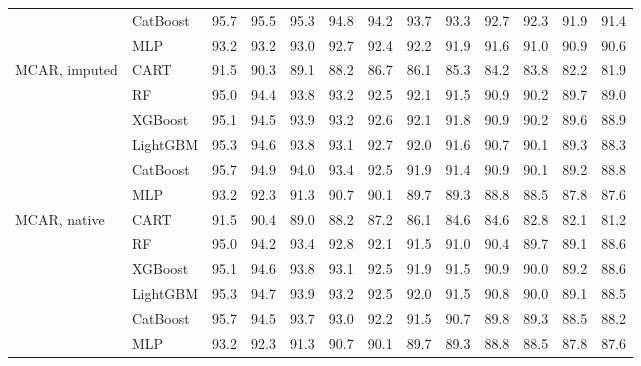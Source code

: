 \begin{table}[p]
\begin{tabular}{@{}llrrrrrrrrrrr@{}}
 & CatBoost & 95.7 & 95.5 & 95.3 & 94.8 & 94.2 & 93.7 & 93.3 & 92.7 & 92.3 & 91.9 & 91.4 \\
 & MLP & 93.2 & 93.2 & 93.0 & 92.7 & 92.4 & 92.2 & 91.9 & 91.6 & 91.0 & 90.9 & 90.6 \\
\midrule
MCAR, imputed & CART & 91.5 & 90.3 & 89.1 & 88.2 & 86.7 & 86.1 & 85.3 & 84.2 & 83.8 & 82.2 & 81.9 \\
 & RF & 95.0 & 94.4 & 93.8 & 93.2 & 92.5 & 92.1 & 91.5 & 90.9 & 90.2 & 89.7 & 89.0 \\
 & XGBoost & 95.1 & 94.5 & 93.9 & 93.2 & 92.6 & 92.1 & 91.8 & 90.9 & 90.2 & 89.6 & 88.9 \\
 & LightGBM & 95.3 & 94.6 & 93.8 & 93.1 & 92.7 & 92.0 & 91.6 & 90.7 & 90.1 & 89.3 & 88.3 \\
 & CatBoost & 95.7 & 94.9 & 94.0 & 93.4 & 92.5 & 91.9 & 91.4 & 90.9 & 90.1 & 89.2 & 88.8 \\
 & MLP & 93.2 & 92.3 & 91.3 & 90.7 & 90.1 & 89.7 & 89.3 & 88.8 & 88.5 & 87.8 & 87.6 \\
\midrule
MCAR, native & CART & 91.5 & 90.4 & 89.0 & 88.2 & 87.2 & 86.1 & 84.6 & 84.6 & 82.8 & 82.1 & 81.2 \\
 & RF & 95.0 & 94.2 & 93.4 & 92.8 & 92.1 & 91.5 & 91.0 & 90.4 & 89.7 & 89.1 & 88.6 \\
 & XGBoost & 95.1 & 94.6 & 93.8 & 93.1 & 92.5 & 91.9 & 91.5 & 90.9 & 90.0 & 89.2 & 88.6 \\
 & LightGBM & 95.3 & 94.7 & 93.9 & 93.2 & 92.5 & 92.0 & 91.5 & 90.8 & 90.0 & 89.1 & 88.5 \\
 & CatBoost & 95.7 & 94.5 & 93.7 & 93.0 & 92.2 & 91.5 & 90.7 & 89.8 & 89.3 & 88.5 & 88.2 \\
 & MLP & 93.2 & 92.3 & 91.3 & 90.7 & 90.1 & 89.7 & 89.3 & 88.8 & 88.5 & 87.8 & 87.6 \\
\bottomrule
\end{tabular}
\end{table}

